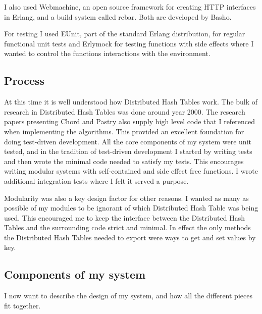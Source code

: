 I also used Webmachine, an open source framework for creating HTTP interfaces in Erlang, and a build system called rebar. Both are developed by Basho.

For testing I used EUnit, part of the standard Erlang distribution, for regular functional unit tests and Erlymock for testing functions with side effects where I wanted to control the functions interactions with the environment.



\subsection{Process}
At this time it is well understood how Distributed Hash Tables work. The bulk of research in Distributed Hash Tables was done around year 2000. The research papers presenting Chord and Pastry also supply high level code that I referenced when implementing the algorithms. This provided an excellent foundation for doing test-driven development. All the core components of my system were unit tested, and in the tradition of test-driven development I started by writing tests and then wrote the minimal code needed to satisfy my tests. This encourages writing modular systems with self-contained and side effect free functions.
I wrote additional integration tests where I felt it served a purpose.

Modularity was also a key design factor for other reasons. I wanted as many as possible of my modules to be ignorant of which Distributed Hash Table was being used. This encouraged me to keep the interface between the Distributed Hash Tables and the surrounding code strict and minimal. In effect the only methods the Distributed Hash Tables needed to export were ways to get and set values by key.



\subsection{Components of my system}
I now want to describe the design of my system, and how all the different pieces fit together.


